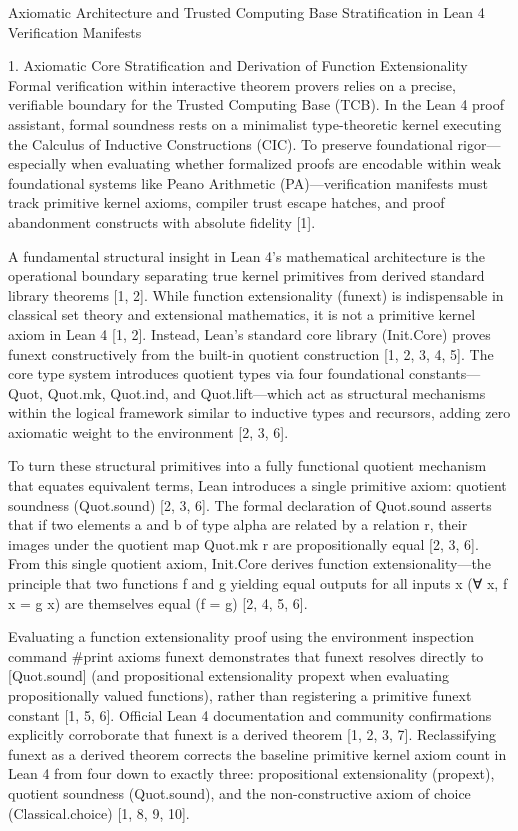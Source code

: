 Axiomatic Architecture and Trusted Computing Base Stratification in Lean 4 Verification Manifests

1. Axiomatic Core Stratification and Derivation of Function Extensionality
Formal verification within interactive theorem provers relies on a precise, verifiable boundary for the Trusted Computing Base (TCB). In the Lean 4 proof assistant, formal soundness rests on a minimalist type-theoretic kernel executing the Calculus of Inductive Constructions (CIC). To preserve foundational rigor—especially when evaluating whether formalized proofs are encodable within weak foundational systems like Peano Arithmetic (PA)—verification manifests must track primitive kernel axioms, compiler trust escape hatches, and proof abandonment constructs with absolute fidelity [1].

A fundamental structural insight in Lean 4’s mathematical architecture is the operational boundary separating true kernel primitives from derived standard library theorems [1, 2]. While function extensionality (funext) is indispensable in classical set theory and extensional mathematics, it is not a primitive kernel axiom in Lean 4 [1, 2]. Instead, Lean’s standard core library (Init.Core) proves funext constructively from the built-in quotient construction [1, 2, 3, 4, 5]. The core type system introduces quotient types via four foundational constants—Quot, Quot.mk, Quot.ind, and Quot.lift—which act as structural mechanisms within the logical framework similar to inductive types and recursors, adding zero axiomatic weight to the environment [2, 3, 6].

To turn these structural primitives into a fully functional quotient mechanism that equates equivalent terms, Lean introduces a single primitive axiom: quotient soundness (Quot.sound) [2, 3, 6]. The formal declaration of Quot.sound asserts that if two elements a and b of type alpha are related by a relation r, their images under the quotient map Quot.mk r are propositionally equal [2, 3, 6]. From this single quotient axiom, Init.Core derives function extensionality—the principle that two functions f and g yielding equal outputs for all inputs x (∀ x, f x = g x) are themselves equal (f = g) [2, 4, 5, 6].

Evaluating a function extensionality proof using the environment inspection command #print axioms funext demonstrates that funext resolves directly to [Quot.sound] (and propositional extensionality propext when evaluating propositionally valued functions), rather than registering a primitive funext constant [1, 5, 6]. Official Lean 4 documentation and community confirmations explicitly corroborate that funext is a derived theorem [1, 2, 3, 7]. Reclassifying funext as a derived theorem corrects the baseline primitive kernel axiom count in Lean 4 from four down to exactly three: propositional extensionality (propext), quotient soundness (Quot.sound), and the non-constructive axiom of choice (Classical.choice) [1, 8, 9, 10].

